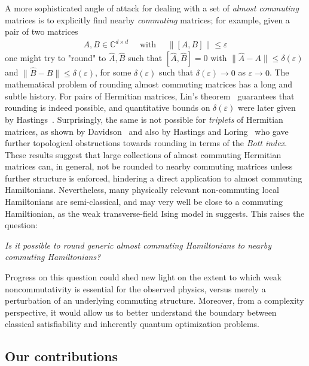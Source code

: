 \documentclass[11pt]{article}
\theoremstyle{plain}
\newcommand{\eps}{\varepsilon}
\begin{document}
A more sophisticated angle of attack for dealing with a set of \emph{almost commuting} matrices is to explicitly find nearby \emph{commuting} matrices; for example, given a pair of two matrices
\begin{align}
A,B \in \mathbb{C}^{d \times d}\quad \text{ with } \quad \|[A,B]\| \leq \eps    
\end{align}
one might try to "round" to $\hat{A},\hat{B}$ such that $[\hat A,\hat B]=0$ with $\|\hat A-A\| \leq \delta(\eps)$ and
$\|\hat B-B\| \leq \delta(\eps)$, for some $\delta(\eps)$ such that $\delta(\eps) \rightarrow 0$ as $\eps \rightarrow 0$.
The mathematical problem of rounding almost commuting matrices has a long and subtle history.  For pairs of 
Hermitian matrices, Lin's theorem~\cite{Lin1997} guarantees that rounding is indeed possible, and
quantitative bounds on $\delta(\eps)$ were later given by Hastings~\cite{Hastings_2009,herrera2022hastingsapproachlinstheorem}.  
Surprisingly, the same is not possible for \emph{triplets} of Hermitian matrices, as shown by Davidson~\cite{Davidson1985} and also by 
Hastings and Loring~\cite{Hastings_2010} who gave further topological obstructions towards rounding in terms of the \emph{Bott index}. These results suggest that large collections of almost commuting Hermitian matrices can, in general, not be rounded to nearby commuting matrices unless further structure is enforced, hindering a direct application to almost commuting Hamiltonians. Nevertheless, many physically relevant non-commuting local Hamiltonians are semi-classical, and may very well be close to a commuting Hamiltionian, as the weak transverse-field Ising model in  suggests. This raises the question:
\begin{center}
\emph{Is it possible to round generic almost commuting Hamiltonians
to nearby commuting Hamiltonians?}
\end{center}



Progress on this question could shed new light on the extent to which weak noncommutativity is essential for the observed physics, versus merely a perturbation of an underlying commuting structure. Moreover, from a complexity perspective, it would allow us to better understand the boundary between classical satisfiability and inherently quantum optimization problems.



\subsection{Our contributions}
\end{document}
